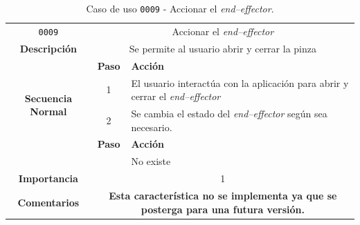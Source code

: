 \begin{table}[H]
    \centering
    \begin{tabularx}{\textwidth}{|c|c|X|}
        \cline{1-3}
        \texttt{0009}        & \multicolumn{2}{c|}{Accionar el \textit{end--effector}}                                      
        \\ \cline{1-3}
        \textbf{Descripción} & \multicolumn{2}{m{13cm}|}{Se permite al usuario abrir y cerrar la pinza}
        \\ \cline{1-3}
        \multirow{4}{*}{\textbf{Secuencia Normal}} & \textbf{Paso} & \textbf{Acción}
        \\ \cline{2-3}                    &   1  & El usuario interactúa con la aplicación para abrir y cerrar el \textit{end--effector}
        \\ \cline{2-3}                    &   2  & Se cambia el estado del \textit{end--effector} según sea necesario. 
        \\ \cline{1-3}
        \multirow{2}{*}{\textbf{Excepciones}} & \textbf{Paso} & \textbf{Acción}
        \\ \cline{2-3}                    &      &  No existe
        \\ \cline{1-3}
        \textbf{Importancia}                 & \multicolumn{2}{c|}{1}           
        \\ \cline{1-3}
        \textbf{Comentarios}                 & \multicolumn{2}{m{13cm}|}{\textbf{Esta característica no se implementa ya que se posterga para una futura versión.}}
        \\ \cline{1-3}
    \end{tabularx}
    \caption{Caso de uso \texttt{0009} - Accionar el \textit{end--effector}.}
    \label{tab:CU0009}
    \label{tab:caso_de_uso_accionar_end_effector}
\end{table}

